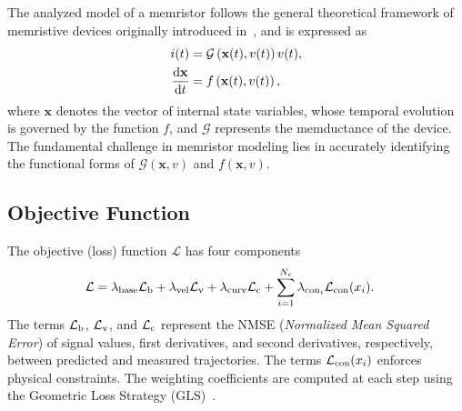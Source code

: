 \documentclass[a4,journal]{IEEEtran}
\newcommand{\der}{{\rm d}}
\newcommand{\G}{\mathcal{G}} %
\newcommand{\ua}{v}
\newcommand{\ia}{i}
\newcommand{\Loss}{\mathcal{L}}
\newcommand{\LossBase}{\Loss_{\rm b}}
\newcommand{\LossVel}{\Loss_{\rm v}}
\newcommand{\LossCur}{\Loss_{\rm c}}
\begin{document}
The analyzed model of a memristor follows the general theoretical framework of memristive devices originally introduced in~\cite{Chua1976}, and is expressed as
\newcommand{\xvec}{\mathbf{x}}
\begin{subequations}
  \label{eq:memristor_model}
  \begin{align}
    \ia(t)                    & = \G \left(\xvec(t),\ua(t)\right) \ua(t), \label{eq:memristor_model1} \\
    \frac{\der \xvec}{\der t} & = f\left(\xvec(t),\ua(t)\right), \label{eq:memristor_model2}
  \end{align}
\end{subequations}
where \(\xvec\) denotes the vector of internal state variables, whose temporal evolution is governed by the function \(f\), and \(\G\) represents the memductance of the device. The fundamental challenge in memristor modeling lies in accurately identifying the functional forms of \(\G(\xvec,\ua)\) and \(f(\xvec,\ua)\).


\subsection{Objective Function}
\noindent The objective (loss) function \(\Loss\) has four components
\begin{align}
  \Loss & = \lambda_{\rm base} \LossBase + \lambda_{\rm vel} \LossVel + \lambda_{\rm curv} \LossCur + \sum^{N_c}_{i=1} \lambda_{{\rm con}_i} \Loss_{\rm con}(x_i).\label{eq:loss_function}
\end{align}
The terms \(\LossBase\), \(\LossVel\), and \(\LossCur\) represent the NMSE (\textit{Normalized Mean Squared Error}) of signal values, first derivatives, and second derivatives, respectively, between predicted and measured trajectories. The terms \(\Loss_{\rm con}(x_i)\) enforces physical constraints. The weighting coefficients are computed at each step using the Geometric Loss Strategy (GLS)~\cite{Cipolla2018}.
\end{document}
